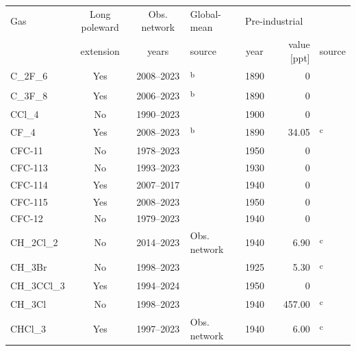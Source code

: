 \begin{tabular}{lcclcrl}
\tophline
Gas & Long poleward & Obs. network & Global-mean & \multicolumn{3}{l}{Pre-industrial} \\
 & extension & years & source & year & value [ppt] & source \\
\middlehline
    C_2F_6 & Yes & 2008--2023 & \citet{trudinger_pfcs_2016}\textsuperscript{b} & 1890 & 0 & \citet{meinshausen_historical-ghgs_2017} \\
    C_3F_8 & Yes & 2006--2023 & \citet{trudinger_pfcs_2016}\textsuperscript{b} & 1890 & 0 & \citet{meinshausen_historical-ghgs_2017} \\
    CCl_4 & No & 1990--2023 & \citet{wmo_ozone-ch7_2022} & 1900 & 0 & \citet{walker_cfc-histories_2000} \\
    CF_4 & Yes & 2008--2023 & \citet{trudinger_pfcs_2016}\textsuperscript{b} & 1890 & 34.05 & \citet{trudinger_pfcs_2016,muhle_pfcs_2010}\textsuperscript{c} \\
    CFC-11 & No & 1978--2023 & \citet{wmo_ozone-ch7_2022} & 1950 & 0 & \citet{meinshausen_historical-ghgs_2017} \\
    CFC-113 & No & 1993--2023 & \citet{wmo_ozone-ch7_2022} & 1930 & 0 & \citet{meinshausen_historical-ghgs_2017} \\
    CFC-114 & Yes & 2007--2017 & \citet{wmo_ozone-ch7_2022} & 1940 & 0 & \citet{meinshausen_historical-ghgs_2017} \\
    CFC-115 & Yes & 2008--2023 & \citet{wmo_ozone-ch7_2022} & 1950 & 0 & \citet{meinshausen_historical-ghgs_2017} \\
    CFC-12 & No & 1979--2023 & \citet{wmo_ozone-ch7_2022} & 1940 & 0 & \citet{meinshausen_historical-ghgs_2017} \\
    CH_2Cl_2 & No & 2014--2023 & Obs. network & 1940 & 6.90 & \citet{trudinger_halocarbons-firn_2004}\textsuperscript{c} \\
    CH_3Br & No & 1998--2023 & \citet{wmo_ozone-ch7_2022} & 1925 & 5.30 & \citet{velders-daniel_ods-uncertainty_2014}\textsuperscript{c} \\
    CH_3CCl_3 & Yes & 1994--2024 & \citet{wmo_ozone-ch7_2022} & 1950 & 0 & \citet{meinshausen_historical-ghgs_2017} \\
    CH_3Cl & No & 1998--2023 & \citet{wmo_ozone-ch7_2022} & 1940 & 457.00 & \citet{velders-daniel_ods-uncertainty_2014}\textsuperscript{c} \\
    CHCl_3 & Yes & 1997--2023 & Obs. network & 1940 & 6.00 & \citet{worton_chloroform-firn_2006,aucott_chloroform-emissions_1999}\textsuperscript{c} \\

\end{tabular}
